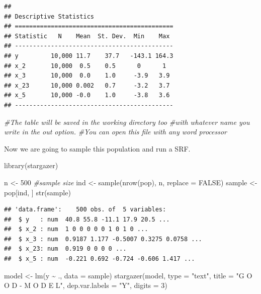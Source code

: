 \documentclass[
]{book}
\newenvironment{Shaded}{\begin{snugshade}}{\end{snugshade}}
\newcommand{\AttributeTok}[1]{\textcolor[rgb]{0.77,0.63,0.00}{#1}}
\newcommand{\CommentTok}[1]{\textcolor[rgb]{0.56,0.35,0.01}{\textit{#1}}}
\newcommand{\ConstantTok}[1]{\textcolor[rgb]{0.00,0.00,0.00}{#1}}
\newcommand{\DecValTok}[1]{\textcolor[rgb]{0.00,0.00,0.81}{#1}}
\newcommand{\FunctionTok}[1]{\textcolor[rgb]{0.00,0.00,0.00}{#1}}
\newcommand{\NormalTok}[1]{#1}
\newcommand{\OtherTok}[1]{\textcolor[rgb]{0.56,0.35,0.01}{#1}}
\newcommand{\SpecialCharTok}[1]{\textcolor[rgb]{0.00,0.00,0.00}{#1}}
\newcommand{\StringTok}[1]{\textcolor[rgb]{0.31,0.60,0.02}{#1}}
\begin{document}
\begin{verbatim}
## 
## Descriptive Statistics
## ============================================
## Statistic   N    Mean  St. Dev.  Min    Max 
## --------------------------------------------
## y         10,000 11.7    37.7   -143.1 164.3
## x_2       10,000  0.5    0.5      0      1  
## x_3       10,000  0.0    1.0     -3.9   3.9 
## x_23      10,000 0.002   0.7     -3.2   3.7 
## x_5       10,000 -0.0    1.0     -3.8   3.6 
## --------------------------------------------
\end{verbatim}

\begin{Shaded}
\begin{Highlighting}[]
\CommentTok{\#The table will be saved in the working directory too}
\CommentTok{\#with whatever name you write in the out option.}
\CommentTok{\#You can open this file with any word processor}
\end{Highlighting}
\end{Shaded}

Now we are going to sample this population and run a SRF.

\begin{Shaded}
\begin{Highlighting}[]
\FunctionTok{library}\NormalTok{(stargazer)}

\NormalTok{n }\OtherTok{\textless{}{-}} \DecValTok{500} \CommentTok{\#sample size}
\NormalTok{ind }\OtherTok{\textless{}{-}} \FunctionTok{sample}\NormalTok{(}\FunctionTok{nrow}\NormalTok{(pop), n, }\AttributeTok{replace =} \ConstantTok{FALSE}\NormalTok{)}
\NormalTok{sample }\OtherTok{\textless{}{-}}\NormalTok{ pop[ind, ]}
\FunctionTok{str}\NormalTok{(sample)}
\end{Highlighting}
\end{Shaded}

\begin{verbatim}
## 'data.frame':    500 obs. of  5 variables:
##  $ y   : num  40.8 55.8 -11.1 17.9 20.5 ...
##  $ x_2 : num  1 0 0 0 0 0 1 0 1 0 ...
##  $ x_3 : num  0.9187 1.177 -0.5007 0.3275 0.0758 ...
##  $ x_23: num  0.919 0 0 0 0 ...
##  $ x_5 : num  -0.221 0.692 -0.724 -0.606 1.417 ...
\end{verbatim}

\begin{Shaded}
\begin{Highlighting}[]
\NormalTok{model }\OtherTok{\textless{}{-}} \FunctionTok{lm}\NormalTok{(y }\SpecialCharTok{\textasciitilde{}}\NormalTok{ ., }\AttributeTok{data =}\NormalTok{ sample)}
\FunctionTok{stargazer}\NormalTok{(model, }\AttributeTok{type =} \StringTok{"text"}\NormalTok{, }\AttributeTok{title =} \StringTok{"G O O D {-}  M O D E L"}\NormalTok{,}
          \AttributeTok{dep.var.labels =} \StringTok{"Y"}\NormalTok{,}
          \AttributeTok{digits =} \DecValTok{3}\NormalTok{)}
\end{Highlighting}
\end{Shaded}
\end{document}
